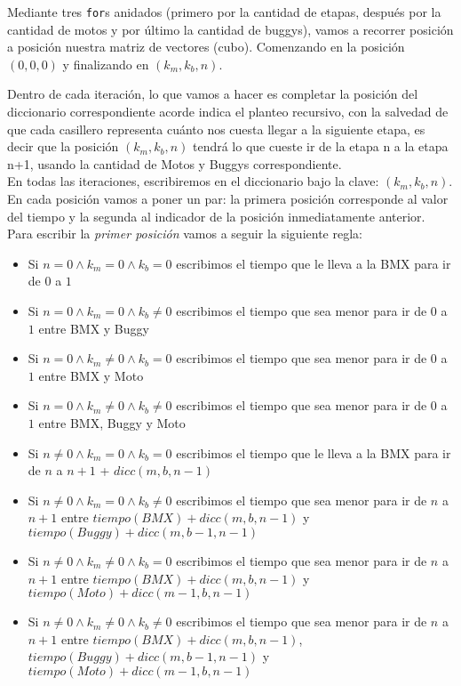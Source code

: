 Mediante tres \texttt{for}s anidados (primero por la cantidad de etapas, despu\'es por la cantidad de motos y por \'ultimo la cantidad de buggys), vamos a recorrer posici\'on a posici\'on nuestra matriz de vectores (cubo). Comenzando en la posici\'on $(0,0,0)$ y finalizando en  $(k_{m},k_{b},n)$.

Dentro de cada iteraci\'on, lo que vamos a hacer es completar la posici\'on del diccionario correspondiente acorde indica el planteo recursivo, con la salvedad de que cada casillero representa cu\'anto nos cuesta llegar a la siguiente etapa, es decir que la posici\'on $(k_{m},k_{b},n)$ tendr\'a lo que cueste ir de la etapa n a la etapa n+1, usando la cantidad de Motos y Buggys correspondiente.\\


En todas las iteraciones, escribiremos en el diccionario bajo la clave:  $(k{_m}, k{_b}, n)$. En cada posici\'on vamos a poner un par: la primera posici\'on corresponde al valor del tiempo y la segunda al indicador de la posici\'on inmediatamente anterior.\\

Para escribir la \emph{primer posici\'on} vamos a seguir la siguiente regla:

\begin{itemize}
\item Si $n=0 \wedge k_m=0 \wedge k_b=0$ escribimos el tiempo que le lleva a la BMX para ir de $0$ a $1$
\item Si $n=0 \wedge k_m=0 \wedge k_b\neq0$ escribimos el tiempo que sea menor para ir  de $0$ a $1$ entre BMX y Buggy
\item Si $n=0 \wedge k_m\neq0 \wedge k_b=0$ escribimos el tiempo que sea menor para ir  de $0$ a $1$ entre BMX y Moto
\item Si $n=0 \wedge k_m\neq0 \wedge k_b\neq0$ escribimos el tiempo que sea menor para ir  de $0$ a $1$ entre BMX, Buggy y Moto
\item Si $n\neq0 \wedge k_m=0 \wedge k_b=0$ escribimos el tiempo que le lleva a la BMX para ir de $n$ a $n+1$ + $dicc(m, b, n-1)$
\item Si $n\neq0 \wedge k_m=0 \wedge k_b\neq0$ escribimos el tiempo que sea menor para ir  de $n$ a $n+1$ entre $tiempo(BMX) + dicc(m, b, n-1)$ y $tiempo(Buggy) + dicc(m, b-1, n-1)$
\item Si $n\neq0 \wedge k_m\neq0 \wedge k_b=0$ escribimos el tiempo que sea menor para ir  de $n$ a $n+1$ entre $tiempo(BMX) + dicc(m, b, n-1)$ y $tiempo(Moto) + dicc(m-1, b, n-1)$
\item Si $n\neq0 \wedge k_m\neq0 \wedge k_b\neq0$ escribimos el tiempo que sea menor para ir  de $n$ a $n+1$ entre $tiempo(BMX) + dicc(m, b, n-1)$, $tiempo(Buggy) + dicc(m, b-1, n-1)$ y $tiempo(Moto) + dicc(m-1, b, n-1)$
\end{itemize}

